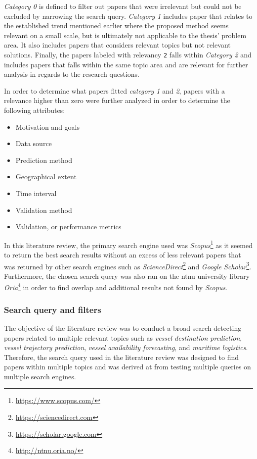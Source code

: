 \textit{Category 0} is defined to filter out papers that were irrelevant but could not be excluded by narrowing the search query. \textit{Category 1} includes paper that relates to the established trend mentioned earlier where the proposed method seems relevant on a small scale, but is ultimately not applicable to the thesis' problem area. It also includes papers that considers relevant topics but not relevant solutions. Finally, the papers labeled with relevancy \texttt{2} falls within \textit{Category 2} and includes papers that falls within the same topic area and are relevant for further analysis in regards to the research questions.

In order to determine what papers fitted \textit{category 1} and \textit{2}, papers with a relevance higher than zero were further analyzed in order to determine the following attributes:

\begin{itemize}
    \item Motivation and goals
    \item Data source
    \item Prediction method
    \item Geographical extent
    \item Time interval
    \item Validation method
    \item Validation, or performance metrics
\end{itemize}

In this literature review, the primary search engine used was \textit{Scopus}\footnote{\url{https://www.scopus.com/}} as it seemed to return the best search results without an excess of less relevant papers that was returned by other search engines such as \textit{ScienceDirect}\footnote{\url{https://sciencedirect.com}} and \textit{Google Scholar}\footnote{\url{https://scholar.google.com}}. Furthermore, the chosen search query was also ran on the \acrshort{ntnu} university library \textit{Oria}\footnote{\url{http://ntnu.oria.no/}} in order to find overlap and additional results not found by \textit{Scopus}.

\subsubsection{Search query and filters}

The objective of the literature review was to conduct a broad search detecting papers related to multiple relevant topics such as \textit{vessel destination prediction}, \textit{vessel trajectory prediction}, \textit{vessel availability forecasting}, and \textit{maritime logistics}. Therefore, the search query used in the literature review was designed to find papers within multiple topics and was derived at from testing multiple queries on multiple search engines.

